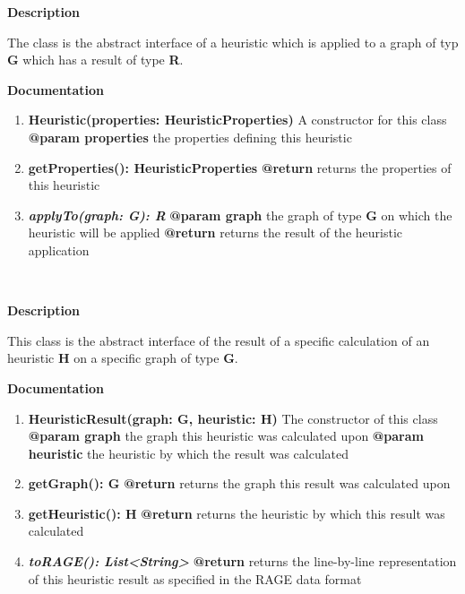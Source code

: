 	
	
	
	\textbf{Description}
	
	The class is the abstract interface of a heuristic which is applied to a graph of typ \textbf{G} which has a result of type \textbf{R}.
	
	\textbf{Documentation}
	\begin{enumerate}[+]
		\item{
			\textbf{Heuristic(properties: HeuristicProperties)} \newline
			A constructor for this class \newline
			\textbf{@param properties} the properties defining this heuristic
		}
		\item{
			\textbf{getProperties(): HeuristicProperties} \newline
			\textbf{@return} returns the properties of this heuristic
		}
		\item{
			\textbf{\textit{applyTo(graph: G): R}} \newline
			\textbf{@param graph} the graph of type \textbf{G} on which the heuristic will be applied \newline
			\textbf{@return} returns the result of the heuristic application
		}
	\end{enumerate}
	
	~\newline
	~\newline
	~\newline
	
	
	\textbf{Description}
	
	This class is the abstract interface of the result of a specific calculation of an heuristic \textbf{H} on a specific graph of type \textbf{G}. 
	
	\textbf{Documentation}
	\begin{enumerate}[+]
		\item{
			\textbf{HeuristicResult(graph: G, heuristic: H)} \newline
			The constructor of this class \newline
			\textbf{@param graph} the graph this heuristic was calculated upon \newline
			\textbf{@param heuristic} the heuristic by which the result was calculated
		}
		\item{
			\textbf{getGraph(): G} \newline
			\textbf{@return} returns the graph this result was calculated upon
		}
		\item{
			\textbf{getHeuristic(): H} \newline
			\textbf{@return} returns the heuristic by which this result was calculated
		}
		\item{
			\textbf{\textit{toRAGE(): List<String>}} \newline
			\textbf{@return} returns the line-by-line representation of this heuristic result as specified in the RAGE data format
		}
	\end{enumerate}
	
